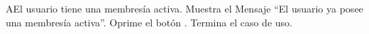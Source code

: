 		
		
		
		
		
		
		
			
		
		\begin{UCtrayectoriaA}{A}{El usuario tiene una membresía activa.}
			\UCpaso Muestra el Mensaje ``El usuario ya posee una membresía activa''.
			\UCpaso[\UCactor] Oprime el botón .
			\UCpaso[] Termina el caso de uso.
		\end{UCtrayectoriaA}

